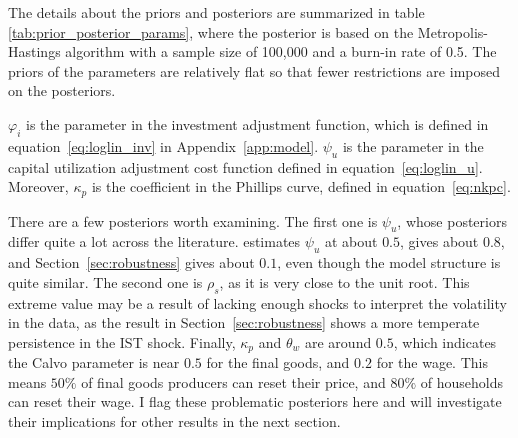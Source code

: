 The details about the priors and posteriors are summarized in table \ref{tab:prior_posterior_params}, where the posterior is based on the Metropolis-Hastings algorithm with a sample size of 100,000 and a burn-in rate of 0.5. The priors of the parameters are relatively flat so that fewer restrictions are imposed on the posteriors.



$\varphi_i$ is the parameter in the investment adjustment function, which is defined in equation~\eqref{eq:loglin_inv} in Appendix~\ref{app:model}. $\psi_u$ is the parameter in the capital utilization adjustment cost function defined in equation~\eqref{eq:loglin_u}. Moreover, $\kappa_p$ is the coefficient in the Phillips curve, defined in equation~\eqref{eq:nkpc}.

There are a few posteriors worth examining. The first one is $\psi_u$, whose posteriors differ quite a lot across the literature. \cite{smetsShocksFrictionsUS2007} estimates $\psi_u$ at about $0.5$, \cite{justinianoInvestmentShocksBusiness2010} gives about $0.8$, and Section~\ref{sec:robustness} gives about $0.1$, even though the model structure is quite similar. The second one is $\rho_s$, as it is very close to the unit root. This extreme value may be a result of lacking enough shocks to interpret the volatility in the data, as the result in Section~\ref{sec:robustness} shows a more temperate persistence in the IST shock. Finally, $\kappa_p$ and $\theta_w$ are around $0.5$, which indicates the Calvo parameter is near $0.5$ for the final goods, and $0.2$ for the wage. This means $50\%$ of final goods producers can reset their price, and $80\%$ of households can reset their wage. I flag these problematic posteriors here and will investigate their implications for other results in the next section.